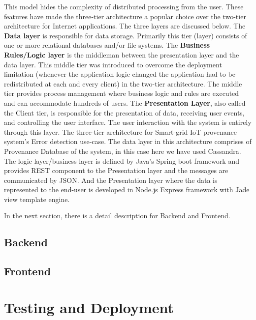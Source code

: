 \documentclass[11pt]{report}
\begin{document}
    This  model hides  the  complexity  of  distributed  processing  from  the  user.  These features   have   made   the   three-tier   architecture   a   popular choice over the two-tier architecture for Internet applications. The three layers are discussed below.
    \newline
    \newline
    The \textbf{Data layer} is  responsible  for  data  storage.  Primarily  this  tier  (layer)  consists of one or more relational databases and/or file systems.
    \newline
    \newline
    The \textbf{Business Rules/Logic layer} is the middleman between the presentation layer and  the  data  layer. This  middle  tier  was  introduced  to  overcome  the  deployment limitation (whenever
    the application logic changed the application had to be redistributed at  each  and  every  client)  in  the  two-tier  architecture.  The  middle  tier  provides  process
    management where business logic and rules are executed and can accommodate hundreds of  users.
    \newline
    \newline
    The \textbf{Presentation  Layer},  also  called  the Client  tier,  is responsible  for the presentation  of  data,  receiving  user  events,  and  controlling  the  user  interface.  The  user
    interaction with the system is entirely through this layer.
    \newline
    \newline
    The three-tier architecture for Smart-grid IoT provenance system's Error detection use-case. The data layer in this architecture comprises of Provenance Database of the system, in this case here we have used Cassandra. The logic layer/business layer is defined by Java's Spring boot framework and provides REST component to the Presentation layer and the messages are communicated by JSON. And the Presentation layer where the data is represented to the end-user is developed in Node.js Express framework with Jade view template engine.

    In the next section, there is a detail description for Backend and Frontend.



    \subsection{Backend}




    \subsection{Frontend}


    \section{Testing and Deployment}
\end{document}
